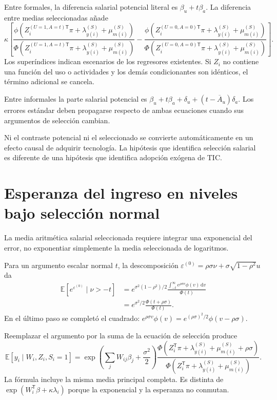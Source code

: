 \documentclass[11pt,a4paper]{article}
\newcommand{\E}{\mathbb E}
\begin{document}
Entre formales, la diferencia salarial potencial literal es $\beta_u+t\beta_a$. La diferencia entre medias seleccionadas añade
\[
\kappa\left[
\frac{\phi(Z_i^{(U=1,A=t)\mathsf T}\pi+\lambda_{y(i)}^{(S)}+\mu_{m(i)}^{(S)})}
{\Phi(Z_i^{(U=1,A=t)\mathsf T}\pi+\lambda_{y(i)}^{(S)}+\mu_{m(i)}^{(S)})}
-
\frac{\phi(Z_i^{(U=0,A=0)\mathsf T}\pi+\lambda_{y(i)}^{(S)}+\mu_{m(i)}^{(S)})}
{\Phi(Z_i^{(U=0,A=0)\mathsf T}\pi+\lambda_{y(i)}^{(S)}+\mu_{m(i)}^{(S)})}
\right].
\]
Los superíndices indican escenarios de los regresores existentes. Si $Z_i$ no contiene una función del uso o actividades y los demás condicionantes son idénticos, el término adicional se cancela.

Entre informales la parte salarial potencial es
$\beta_u+t\beta_a+\delta_u+(t-\overline A_u)\delta_a$.
Los errores estándar deben propagarse respecto de ambas ecuaciones cuando sus argumentos de selección cambian.

Ni el contraste potencial ni el seleccionado se convierte automáticamente en un efecto causal de adquirir tecnología. La hipótesis que identifica selección salarial es diferente de una hipótesis que identifica adopción exógena de TIC.

\clearpage
\section{Esperanza del ingreso en niveles bajo selección normal}

La media aritmética salarial seleccionada requiere integrar una exponencial del error, no exponentiar simplemente la media seleccionada de logaritmos.

Para un argumento escalar normal $t$, la descomposición
$\varepsilon^{(0)}=\rho\sigma\nu+\sigma\sqrt{1-\rho^2}u$
da
\[
\begin{aligned}
\E[e^{\varepsilon^{(0)}}\mid\nu>-t]
&=e^{\sigma^2(1-\rho^2)/2}
\frac{\int_{-t}^{\infty}e^{\rho\sigma v}\phi(v)\,\mathrm dv}{\Phi(t)}\\
&=e^{\sigma^2/2}\frac{\Phi(t+\rho\sigma)}{\Phi(t)}.
\end{aligned}
\]
En el último paso se completó el cuadrado:
$e^{\rho\sigma v}\phi(v)=e^{(\rho\sigma)^2/2}\phi(v-\rho\sigma)$.

Reemplazar el argumento por la suma de la ecuación de selección produce
\[
\E[y_i\mid W_i,Z_i,S_i=1]
=\exp\left(\sum_jW_{ij}\beta_j+\frac{\sigma^2}{2}\right)
\frac{\Phi(Z_i^{\mathsf T}\pi+\lambda_{y(i)}^{(S)}+\mu_{m(i)}^{(S)}+\rho\sigma)}
{\Phi(Z_i^{\mathsf T}\pi+\lambda_{y(i)}^{(S)}+\mu_{m(i)}^{(S)})}.
\]
La fórmula incluye la misma media principal completa. Es distinta de
$\exp(W_i^{\mathsf T}\beta+\kappa\lambda_i)$ porque la exponencial y la esperanza no conmutan.
\end{document}
